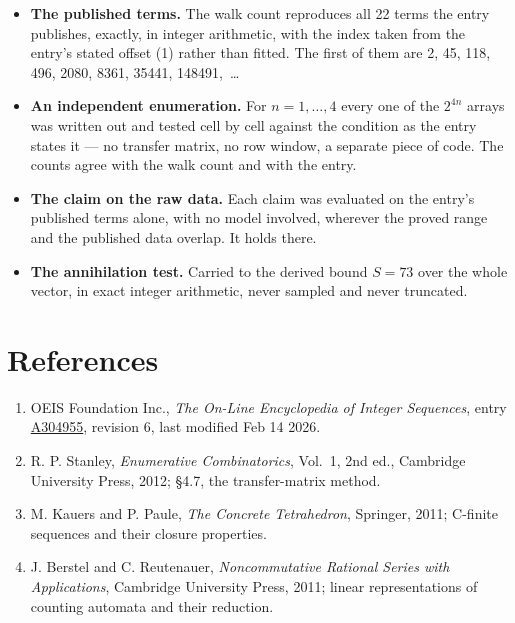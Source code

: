 \documentclass[11pt]{article}
\theoremstyle{definition}
\begin{document}
\begin{itemize}

\item {\bfseries The published terms.} The walk count reproduces all 22 terms the entry publishes, exactly, in integer arithmetic, with the index taken from the entry's stated offset (1) rather than fitted. The first of them are 2, 45, 118, 496, 2080, 8361, 35441, 148491,~\dots

\item {\bfseries An independent enumeration.} For $n = 1,\dots,4$ every one of the $2^{4n}$ arrays was written out and tested cell by cell against the condition as the entry states it --- no transfer matrix, no row window, a separate piece of code. The counts agree with the walk count and with the entry.

\item {\bfseries The claim on the raw data.} Each claim was evaluated on the entry's published terms alone, with no model involved, wherever the proved range and the published data overlap. It holds there.

\item {\bfseries The annihilation test.} Carried to the derived bound $S = 73$ over the whole vector, in exact integer arithmetic, never sampled and never truncated.

\end{itemize}

\section{References}

\begin{enumerate}

\item OEIS Foundation Inc., \emph{The On-Line Encyclopedia of Integer Sequences}, entry \href{https://oeis.org/A304955}{A304955}, revision 6, last modified Feb 14 2026.

\item R. P. Stanley, \emph{Enumerative Combinatorics}, Vol.~1, 2nd ed., Cambridge University Press, 2012; \S4.7, the transfer-matrix method.

\item M. Kauers and P. Paule, \emph{The Concrete Tetrahedron}, Springer, 2011; C-finite sequences and their closure properties.

\item J. Berstel and C. Reutenauer, \emph{Noncommutative Rational Series with Applications}, Cambridge University Press, 2011; linear representations of counting automata and their reduction.

\end{enumerate}
\end{document}
